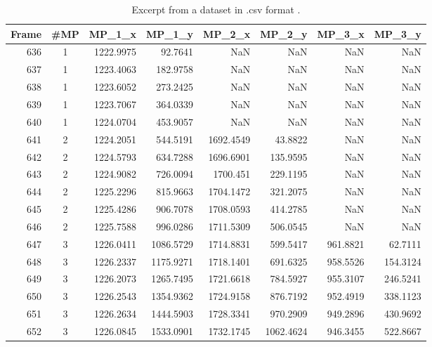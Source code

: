 \begin{table}[ht]
    \caption{Excerpt from a dataset in .csv format \cite{hornberger2018}.}
	\small
	\centering
    \begin{tabular}{@{}rcrrrrrr@{}}
    \toprule
    Frame   & \#MP & MP\_1\_x  & MP\_1\_y  & MP\_2\_x  & MP\_2\_y  & MP\_3\_x & MP\_3\_y \\ \midrule
    636     & 1    & 1222.9975 & 92.7641   & NaN       & NaN       & NaN      & NaN      \\
    637     & 1    & 1223.4063 & 182.9758  & NaN       & NaN       & NaN      & NaN      \\
    638     & 1    & 1223.6052 & 273.2425  & NaN       & NaN       & NaN      & NaN      \\
    639     & 1    & 1223.7067 & 364.0339  & NaN       & NaN       & NaN      & NaN      \\
    640     & 1    & 1224.0704 & 453.9057  & NaN       & NaN       & NaN      & NaN      \\
    641     & 2    & 1224.2051 & 544.5191  & 1692.4549 & 43.8822   & NaN      & NaN      \\
    642     & 2    & 1224.5793 & 634.7288  & 1696.6901 & 135.9595  & NaN      & NaN      \\
    643     & 2    & 1224.9082 & 726.0094  & 1700.451  & 229.1195  & NaN      & NaN      \\
    644     & 2    & 1225.2296 & 815.9663  & 1704.1472 & 321.2075  & NaN      & NaN      \\
    645     & 2    & 1225.4286 & 906.7078  & 1708.0593 & 414.2785  & NaN      & NaN      \\
    646     & 2    & 1225.7588 & 996.0286  & 1711.5309 & 506.0545  & NaN      & NaN      \\
    647     & 3    & 1226.0411 & 1086.5729 & 1714.8831 & 599.5417  & 961.8821 & 62.7111  \\
    648     & 3    & 1226.2337 & 1175.9271 & 1718.1401 & 691.6325  & 958.5526 & 154.3124 \\
    649     & 3    & 1226.2073 & 1265.7495 & 1721.6618 & 784.5927  & 955.3107 & 246.5241 \\
    650     & 3    & 1226.2543 & 1354.9362 & 1724.9158 & 876.7192  & 952.4919 & 338.1123 \\
    651     & 3    & 1226.2634 & 1444.5903 & 1728.3341 & 970.2909  & 949.2896 & 430.9692 \\
    652     & 3    & 1226.0845 & 1533.0901 & 1732.1745 & 1062.4624 & 946.3455 & 522.8667 \\

\end{tabular}
\end{table}
